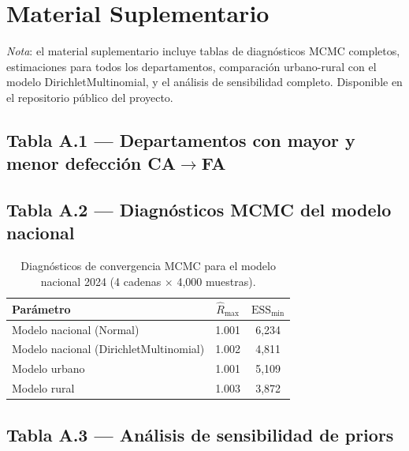 \documentclass[12pt,a4paper]{article}
\begin{document}

\newpage


\newpage


\newpage


\newpage


\newpage



\FloatBarrier
\newpage


\newpage
\appendix
\setcounter{section}{0}
\renewcommand{\thesection}{A}

\section{Material Suplementario}
\label{sec:suplementario}

\textit{Nota}: el material suplementario incluye tablas de diagnósticos MCMC completos, estimaciones para todos los departamentos, comparación urbano-rural con el modelo DirichletMultinomial, y el análisis de sensibilidad completo. Disponible en el repositorio público del proyecto.

\subsection{Tabla A.1 — Departamentos con mayor y menor defección CA$\to$FA}



\subsection{Tabla A.2 — Diagnósticos MCMC del modelo nacional}

\begin{table}[H]
\centering
\caption{Diagnósticos de convergencia MCMC para el modelo nacional 2024 (4 cadenas $\times$ 4{,}000 muestras).}
\label{tab:diagnostics_rucp}
\begin{tabular}{lcc}
\toprule
\textbf{Parámetro} & $\hat{R}_{\max}$ & $\text{ESS}_{\min}$ \\
\midrule
Modelo nacional (Normal)               & 1.001 & 6{,}234 \\
Modelo nacional (DirichletMultinomial) & 1.002 & 4{,}811 \\
Modelo urbano                          & 1.001 & 5{,}109 \\
Modelo rural                           & 1.003 & 3{,}872 \\
\bottomrule
\end{tabular}
\end{table}

\subsection{Tabla A.3 — Análisis de sensibilidad de priors}


\end{document}
